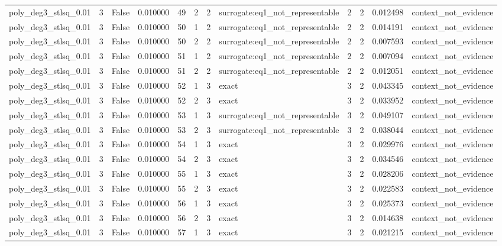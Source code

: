 \begin{tabular}{lrrrrrrlrrrl}
poly\_deg3\_stlsq\_0.01 & 3 & False & 0.010000 & 49 & 2 & 2 & surrogate:eq1\_not\_representable & 2 & 2 & 0.012498 & context\_not\_evidence \\
poly\_deg3\_stlsq\_0.01 & 3 & False & 0.010000 & 50 & 1 & 2 & surrogate:eq1\_not\_representable & 2 & 2 & 0.014191 & context\_not\_evidence \\
poly\_deg3\_stlsq\_0.01 & 3 & False & 0.010000 & 50 & 2 & 2 & surrogate:eq1\_not\_representable & 2 & 2 & 0.007593 & context\_not\_evidence \\
poly\_deg3\_stlsq\_0.01 & 3 & False & 0.010000 & 51 & 1 & 2 & surrogate:eq1\_not\_representable & 2 & 2 & 0.007094 & context\_not\_evidence \\
poly\_deg3\_stlsq\_0.01 & 3 & False & 0.010000 & 51 & 2 & 2 & surrogate:eq1\_not\_representable & 2 & 2 & 0.012051 & context\_not\_evidence \\
poly\_deg3\_stlsq\_0.01 & 3 & False & 0.010000 & 52 & 1 & 3 & exact & 3 & 2 & 0.043345 & context\_not\_evidence \\
poly\_deg3\_stlsq\_0.01 & 3 & False & 0.010000 & 52 & 2 & 3 & exact & 3 & 2 & 0.033952 & context\_not\_evidence \\
poly\_deg3\_stlsq\_0.01 & 3 & False & 0.010000 & 53 & 1 & 3 & surrogate:eq1\_not\_representable & 3 & 2 & 0.049107 & context\_not\_evidence \\
poly\_deg3\_stlsq\_0.01 & 3 & False & 0.010000 & 53 & 2 & 3 & surrogate:eq1\_not\_representable & 3 & 2 & 0.038044 & context\_not\_evidence \\
poly\_deg3\_stlsq\_0.01 & 3 & False & 0.010000 & 54 & 1 & 3 & exact & 3 & 2 & 0.029976 & context\_not\_evidence \\
poly\_deg3\_stlsq\_0.01 & 3 & False & 0.010000 & 54 & 2 & 3 & exact & 3 & 2 & 0.034546 & context\_not\_evidence \\
poly\_deg3\_stlsq\_0.01 & 3 & False & 0.010000 & 55 & 1 & 3 & exact & 3 & 2 & 0.028206 & context\_not\_evidence \\
poly\_deg3\_stlsq\_0.01 & 3 & False & 0.010000 & 55 & 2 & 3 & exact & 3 & 2 & 0.022583 & context\_not\_evidence \\
poly\_deg3\_stlsq\_0.01 & 3 & False & 0.010000 & 56 & 1 & 3 & exact & 3 & 2 & 0.025373 & context\_not\_evidence \\
poly\_deg3\_stlsq\_0.01 & 3 & False & 0.010000 & 56 & 2 & 3 & exact & 3 & 2 & 0.014638 & context\_not\_evidence \\
poly\_deg3\_stlsq\_0.01 & 3 & False & 0.010000 & 57 & 1 & 3 & exact & 3 & 2 & 0.021215 & context\_not\_evidence \\

\end{tabular}
